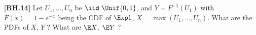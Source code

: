 \begin{exercise}
	\textbf{[BH.14]}  Let $U_1, \ldots, U_n$ be $\iid \ \Unif{0,1}$, and $Y=F^{-1}(U_1)$ with $F(x)=1-e^{-x}$ being the CDF of $\Exp 1$, $X=\max \left(U_1, \ldots, U_n\right)$. What are the PDFs of $X$, $Y$ ? What are $\E X$, $\E Y$ ?
\end{exercise}
